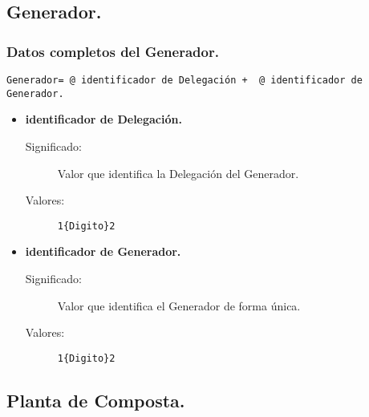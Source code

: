 \subsection{Generador.}

\subsubsection{Datos completos del Generador.}\label{Datos_Generadores}
\begin{lstlisting}
Generador= @ identificador de Delegación +  @ identificador de Generador.
\end{lstlisting}
	\begin{itemize}
		\item \textbf{identificador de Delegación.}
			\begin{description}
				\item [Significado:] Valor que identifica la Delegación del Generador.
				\item [Valores:]{\begin{lstlisting}
1{Digito}2\end{lstlisting}}
			\end{description}
		\item \textbf{identificador de Generador.}\label{idGenerador}
			\begin{description}
				\item [Significado:] Valor que identifica el Generador de forma única.
				\item [Valores:]{\begin{lstlisting}
1{Digito}2\end{lstlisting}}
			\end{description}
	\end{itemize}

\subsection{Planta de Composta.}

